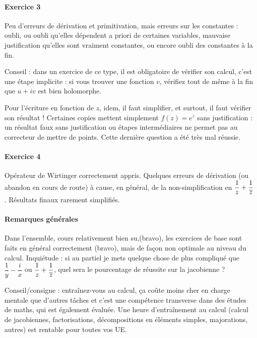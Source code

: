 \paragraph{Exercice 3}

Peu d'erreurs de dérivation et primitivation, mais erreurs sur les constantes : oubli, ou oubli qu'elles dépendent a priori de certaines variables, mauvaise justification qu'elles sont vraiment constantes, ou encore oubli des constantes à la fin.

Conseil : dans un exercice de ce type, il est obligatoire de vérifier son calcul, c'est une étape implicite : si vous trouver une fonction $v$, vérifiez tout de même à la fin que $u+iv$ est bien holomorphe.

Pour l'écriture en fonction de $z$, idem, il faut simplifier, et surtout, il faut vérifier son résultat ! Certaines copies mettent simplement $f(z)=e^z$ sans justification : un résultat faux sans justification ou étapes intermédiaires ne permet pas au correcteur de mettre de points. Cette dernière question a été très mal réussie.

\paragraph{Exercice 4}
Opérateur de Wirtinger correctement appris. Quelques erreurs de dérivation (ou abandon en cours de route) à cause, en général, de la non-simplification en $\dfrac{1}{z}+\dfrac{1}{\overline{z}}$. Résultats finaux rarement simplifiés.

\paragraph{Remarques générales}

Dans l'ensemble, cours relativement bien su,(bravo),  les exercices de base sont faits en général correctement (bravo), mais de façon non optimale au niveau du calcul. 
Inquiétude : si au partiel je mets quelque chose de plus compliqué que $\dfrac{1}{y}-\dfrac{i}{x}$ ou $\dfrac{1}{z}+\dfrac{1}{\overline{z}}$, quel sera le pourcentage de réussite sur la jacobienne ? 

Conseil/consigne : entraînez-vous au calcul,  ça coûte moins cher en charge mentale que d'autres tâches et c'est une compétence transverse dans des études de maths, qui est également évaluée.  Une heure d'entraînement au calcul (calcul de jacobiennes, factorisations, décompositions en éléments simples, majorations, autres) est rentable pour toutes vos UE. 

